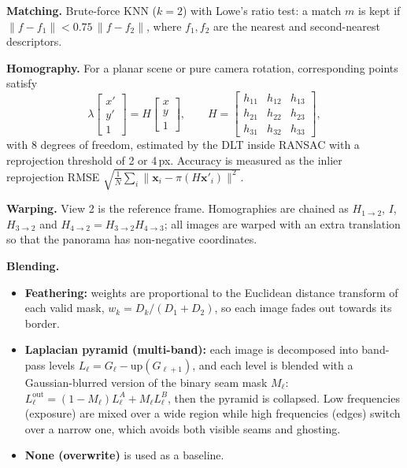 \documentclass[a4paper,12pt]{article}
\begin{document}
\textbf{Matching.} Brute-force KNN ($k=2$) with Lowe's ratio test: a match $m$ is kept if
$\|f-f_1\| < 0.75\,\|f-f_2\|$, where $f_1,f_2$ are the nearest and second-nearest descriptors.

\textbf{Homography.} For a planar scene or pure camera rotation, corresponding points satisfy
\begin{equation}
    \lambda\begin{bmatrix}x'\\y'\\1\end{bmatrix} = H\begin{bmatrix}x\\y\\1\end{bmatrix},\qquad
    H=\begin{bmatrix}h_{11}&h_{12}&h_{13}\\h_{21}&h_{22}&h_{23}\\h_{31}&h_{32}&h_{33}\end{bmatrix},
\end{equation}
with 8 degrees of freedom, estimated by the DLT inside RANSAC with a reprojection threshold of
2 or 4\,px. Accuracy is measured as the inlier reprojection RMSE
$\sqrt{\frac1N\sum_i\|\mathbf x_i - \pi(H\mathbf x'_i)\|^2}$.

\textbf{Warping.} View 2 is the reference frame. Homographies are chained as
$H_{1\to2}$, $I$, $H_{3\to2}$ and $H_{4\to2}=H_{3\to2}H_{4\to3}$; all images are warped
with an extra translation so that the panorama has non-negative coordinates.

\textbf{Blending.}
\begin{itemize}[leftmargin=*]
    \item \textbf{Feathering:} weights are proportional to the Euclidean distance transform of each
          valid mask, $w_k = D_k/(D_1+D_2)$, so each image fades out towards its border.
    \item \textbf{Laplacian pyramid (multi-band):} each image is decomposed into band-pass levels
          $L_\ell = G_\ell - \mathrm{up}(G_{\ell+1})$, and each level is blended with a Gaussian-blurred
          version of the binary seam mask $M_\ell$:
          $L^{\text{out}}_\ell = (1-M_\ell)L^A_\ell + M_\ell L^B_\ell$, then the pyramid is collapsed. Low
          frequencies (exposure) are mixed over a wide region while high frequencies (edges) switch
          over a narrow one, which avoids both visible seams and ghosting.
    \item \textbf{None (overwrite)} is used as a baseline.
\end{itemize}
\end{document}
